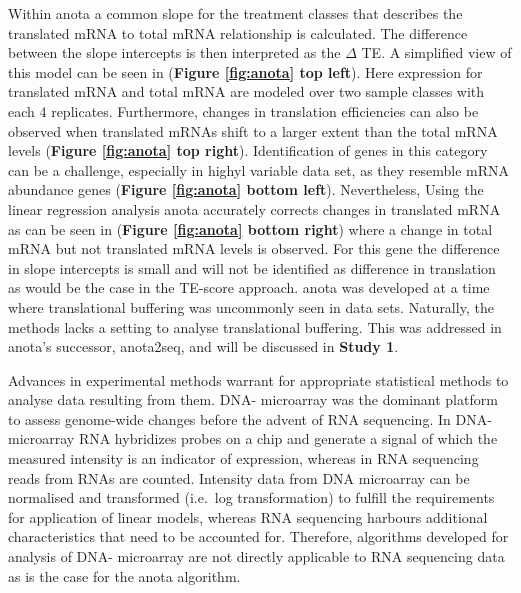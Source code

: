 \documentclass[12pt,openany]{book}
\begin{document}
Within anota a common slope for the treatment classes that describes the
translated mRNA to total mRNA relationship is calculated. The difference
between the slope intercepts is then interpreted as the \(\varDelta\)
TE. A simplified view of this model can be seen in (\textbf{Figure
\ref{fig:anota} top left}). Here expression for translated mRNA and
total mRNA are modeled over two sample classes with each 4 replicates.
Furthermore, changes in translation efficiencies can also be observed
when translated mRNAs shift to a larger extent than the total mRNA
levels (\textbf{Figure \ref{fig:anota} top right}). Identification of
genes in this category can be a challenge, especially in highyl variable
data set, as they resemble mRNA abundance genes (\textbf{Figure
\ref{fig:anota} bottom left}). Nevertheless, Using the linear regression
analysis anota accurately corrects changes in translated mRNA as can be
seen in (\textbf{Figure \ref{fig:anota} bottom right}) where a change in
total mRNA but not translated mRNA levels is observed. For this gene the
difference in slope intercepts is small and will not be identified as
difference in translation as would be the case in the TE-score approach.
anota was developed at a time where translational buffering was
uncommonly seen in data sets. Naturally, the methods lacks a setting to
analyse translational buffering. This was addressed in anota's
successor, anota2seq, and will be discussed in \textbf{Study 1}.

Advances in experimental methods warrant for appropriate statistical
methods to analyse data resulting from them. DNA- microarray was the
dominant platform to assess genome-wide changes before the advent of RNA
sequencing. In DNA- microarray RNA hybridizes probes on a chip and
generate a signal of which the measured intensity is an indicator of
expression, whereas in RNA sequencing reads from RNAs are counted.
Intensity data from DNA microarray can be normalised and transformed
(i.e.~log transformation) to fulfill the requirements for application of
linear models, whereas RNA sequencing harbours additional
characteristics that need to be accounted for. Therefore, algorithms
developed for analysis of DNA- microarray are not directly applicable to
RNA sequencing data as is the case for the anota algorithm.
\end{document}
